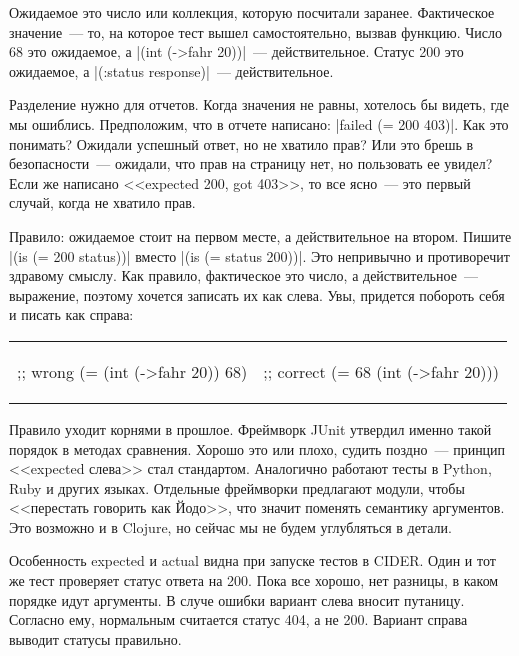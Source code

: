 Ожидаемое это число или коллекция, которую посчитали заранее. Фактическое значение~---
то, на которое тест вышел самостоятельно, вызвав функцию. Число 68 это ожидаемое,
а \spverb|(int (->fahr 20))|~--- действительное. Статус 200 это ожидаемое,
а \spverb|(:status response)|~--- действительное.

Разделение нужно для отчетов. Когда значения не равны, хотелось бы видеть, где
мы ошиблись. Предположим, что в отчете написано: \spverb|failed (= 200 403)|.
Как это понимать? Ожидали успешный ответ, но не хватило прав? Или это брешь в
безопасности~--- ожидали, что прав на страницу нет, но пользовать ее увидел?
Если же написано <<expected 200, got 403>>, то все ясно~--- это первый случай,
когда не хватило прав.

Правило: ожидаемое стоит на первом месте, а действительное на втором. Пишите
\spverb|(is (= 200 status))| вместо \spverb|(is (= status 200))|. Это непривычно
и противоречит здравому смыслу. Как правило, фактическое это число, а
действительное~--- выражение, поэтому хочется записать их как слева. Увы,
придется побороть себя и писать как справа:

\noindent
\begin{tabular}{ @{}p{5cm} @{}p{5cm} }

\begin{english}
  \begin{clojure}
;; wrong
(= (int (->fahr 20)) 68)
  \end{clojure}
\end{english}

&

\begin{english}
  \begin{clojure}
;; correct
(= 68 (int (->fahr 20)))
  \end{clojure}
\end{english}

\end{tabular}

Правило уходит корнями в прошлое. Фреймворк JUnit утвердил именно такой порядок
в методах сравнения.
Хорошо это или плохо, судить поздно~--- принцип <<expected слева>> стал
стандартом. Аналогично работают тесты в Python, Ruby и других языках. Отдельные
фреймворки предлагают модули, чтобы <<перестать говорить как Йодо>>, что значит
поменять семантику аргументов. Это возможно и в Clojure, но сейчас мы не будем
углубляться в детали.

Особенность expected и actual видна при запуске тестов в CIDER. Один и тот же
тест проверяет статус ответа на 200. Пока все хорошо, нет разницы, в каком
порядке идут аргументы. В случе ошибки вариант слева вносит путаницу. Согласно
ему, нормальным считается статус 404, а не 200. Вариант справа выводит статусы
правильно.

